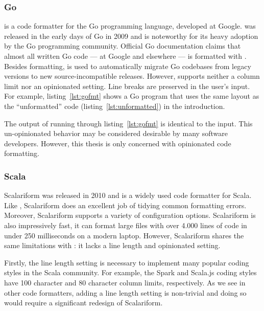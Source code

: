 \subsubsection{Go}
\gofmt\autocite{gofmt94:online} is a code formatter for the Go programming language, developed at Google.
\gofmt{} was released in the early days of Go in 2009 and is noteworthy for its heavy adoption by the Go programming community.
Official Go documentation\autocite{CodeR59:online} claims that almost all written Go code --- at Google and elsewhere --- is formatted with \gofmt{}.
Besides formatting, \gofmt{} is used to automatically migrate Go codebases from legacy versions to new source-incompatible releases.
However, \gofmt{} supports neither a column limit nor an opinionated setting.
Line breaks are preserved in the user's input.
For example, listing~\ref{lst:gofmt} shows a Go program that uses the same layout as the ``unformatted'' code (listing~\ref{lst:unformatted}) in the introduction.

The output of running \gofmt{} through listing~\ref{lst:gofmt} is identical to the input.
This un-opinionated behavior may be considered desirable by many software developers.
However, this thesis is only concerned with opinionated code formatting.

\subsubsection{Scala}\label{sec:scalariform}
Scalariform\autocite{russell_scalariform_2010} was released in 2010 and is a widely used code formatter for Scala.
Like \gofmt{}, Scalariform does an excellent job of tidying common formatting errors.
Moreover, Scalariform supports a variety of configuration options.
Scalariform is also impressively fast, it can format large files with over 4.000 lines of code in under 250 milliseconds on a modern laptop.
However, Scalariform shares the same limitations with \gofmt{}: it lacks a line length and opinionated setting.

Firstly, the line length setting is necessary to implement many popular coding styles in the Scala community.
For example, the Spark\autocite{xin_spark_2015} and Scala.js\autocite{doeraene_scala.js_2015} coding styles have 100 character and 80 character column limits, respectively.
As we see in other code formatters, adding a line length setting is non-trivial and doing so would require a significant redesign of Scalariform.

